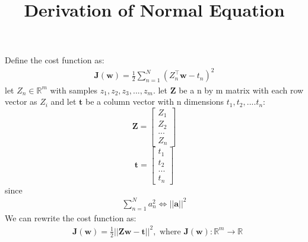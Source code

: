 \documentclass[11pt]{article}
\theoremstyle{plain}
\theoremstyle{definition}
\begin{document}
 
\title{Derivation of Normal Equation}
\maketitle

Define the cost function as: 
\begin{align*}
\mathbf{J}(\mathbf{w}) = \frac{1}{2} \sum \limits_{n=1}^{N} (Z_n^\top \mathbf{w} - t_n)^2  
\end{align*}
let $Z_n \in \mathbb{R}^m$ with samples $z_1, z_2, z_3, ..., z_m$. \newline 
let $\mathbf{Z}$ be a n by m matrix with each row vector as $Z_i$ and let  $\mathbf{t}$ be a column vector with n dimensions $t_1, t_2, .... t_n$:
\[
\mathbf{Z} = \begin{bmatrix}
Z_1 \\
Z_2 \\
... \\
Z_n
\end{bmatrix}
\]
\[
\mathbf{t} = \begin{bmatrix}
t_1 \\
t_2 \\
... \\
t_n
\end{bmatrix}
\]
since \begin{align*}
\sum \limits_{n=1}^{N} a_n^2 \Longleftrightarrow || \mathbf{a}||^2
\end{align*}
We can rewrite the cost function as: 
\begin{align*}
&\mathbf{J}(\mathbf{w}) = \frac{1}{2} ||\mathbf{Zw -t}||^2 , \text{ where }\mathbf{J}(\mathbf{w}) : \mathbb{R}^m \rightarrow \mathbb{R}
\end{align*}
\end{document}
